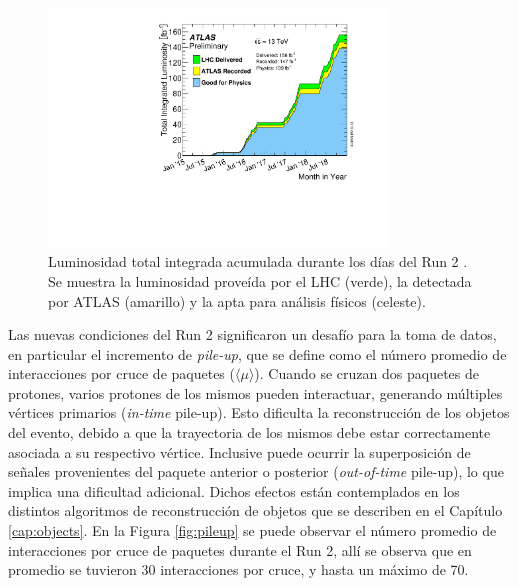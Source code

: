 \begin{figure}
  \centering
  \includegraphics[width=0.8\textwidth]{images/lhc/intlumivstimeRun2DQall.pdf}
  \caption{Luminosidad total integrada acumulada durante los días del Run 2 \cite{lumi_plot}. Se muestra la luminosidad proveída por el LHC (verde), la detectada por ATLAS (amarillo) y la apta para análisis físicos (celeste).}
  \label{fig:run2_lumi}
\end{figure}

Las nuevas condiciones del Run 2 significaron un desafío para la toma de datos, en particular el incremento de \textit{pile-up}, que se define como el número promedio de interacciones por cruce de paquetes ($\langle \mu \rangle$). Cuando se cruzan dos paquetes de protones, varios protones de los mismos pueden interactuar, generando múltiples vértices primarios (\textit{in-time} pile-up). Esto dificulta la reconstrucción de los objetos del evento, debido a que la trayectoria de los mismos debe estar correctamente asociada a su respectivo vértice. Inclusive puede ocurrir la superposición de señales provenientes del paquete anterior o posterior (\textit{out-of-time} pile-up), lo que implica una dificultad adicional. Dichos efectos están contemplados en los distintos algoritmos de reconstrucción de objetos que se describen en el Capítulo \ref{cap:objects}. En la Figura \ref{fig:pileup} se puede observar el número promedio de interacciones por cruce de paquetes durante el Run 2, allí se observa que en promedio se tuvieron 30 interacciones por cruce, y hasta un máximo de 70. 

